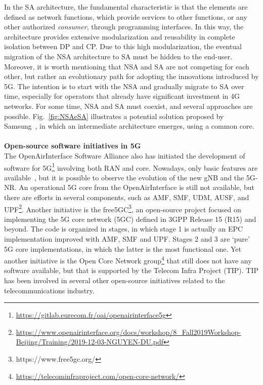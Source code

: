 In the SA architecture, the fundamental characteristic is that the elements are defined as network functions, which provide services to other functions, or any other authorized \textit{consumer}, through programming interfaces. In this way, the architecture provides extensive modularization and reusability in complete isolation between DP and CP. Due to this high modularization, the eventual migration of the NSA architecture to SA must be hidden to the end-user. Moreover, it is worth mentioning that NSA and SA are not competing for each other, but rather an evolutionary path for adopting the innovations introduced by 5G. The intention is to start with the NSA and gradually migrate to SA over time, especially for operators that already have significant investment in 4G networks. For some time, NSA and SA must coexist, and several approaches are possible. Fig.~\ref{fig:NSAeSA} illustrates a potential solution proposed by Samsung~\cite{samsung-2019}, in which an intermediate architecture emerges, using a common core.\\
\\
\textbf{Open-source software initiatives in 5G}\\
The OpenAirInterface Software Alliance also has initiated the development of software for 5G\footnote{\url{https://gitlab.eurecom.fr/oai/openairinterface5g}} involving both RAN and core. Nowadays, only basic features are available~\cite{kaltenberger:19}, but it is possible to observe the evolution of the new gNB and the 5G-NR. An operational 5G core from the OpenAirInterface is still not available, but there are efforts in several components, such as AMF, SMF, UDM, AUSF, and UPF\footnote{\url{https://www.openairinterface.org/docs/workshop/8_Fall2019Workshop-Beijing/Training/2019-12-03-NGUYEN-DU.pdf}}. Another initiative is the free5GC\footnote{https://www.free5gc.org/}, an open-source project focused on implementing the 5G core network (5GC) defined in 3GPP Release 15 (R15) and beyond. The code is organized in stages, in which stage 1 is actually an EPC implementation improved with AMF, SMF and UPF. Stages 2 and 3 are `pure' 5G core implementations, in which the latter is the most functional one. Yet another initiative is the Open Core Network group\footnote{\url{https://telecominfraproject.com/open-core-network/}} that still does not have any software available, but that is supported by the Telecom Infra Project (TIP). TIP has been involved in several other open-source initiatives related to the telecommunications industry.

